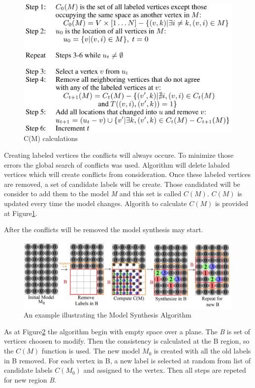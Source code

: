 \documentclass[b5paper,twoside,11pt]{article}
\renewcommand{\figurename}{Figure}
\begin{document}
\begin{figure}[h]
	\centering
	\includegraphics[width=0.85	\textwidth]{calcC}
		\caption{C(M) calculations}
	\label{CMCalc}
\end{figure}
Creating labeled vertices the conflicts will always occure. To minimize those errors the global search of conflicts was used. Algorithm will delete labaled vertices which will create conflicts from consideration. Once these labeled vertices are removed, a set of candidate labels will be create. Those candidated will be consider to add them to the model \textit{M} and this set is called $C(M)$. $C(M)$ is updated every time the model changes. Algorith to calculate $C(M)$ is provided at \figurename\ref{CMCalc}.

After the conflicts will be removed the model synthesis may start.

\begin{figure}[h]
	\centering
	\includegraphics[width=0.9	\textwidth]{modelSynthesis}
	\caption{An example illustrating the Model Synthesis Algorithm}
	\label{ModSynth}
\end{figure}
As at \figurename\ref{ModSynth} the algorithm begin with empty space over a plane. The \textit{B} is set of vertices choosen to modify. Then the consistency is calculated at the B region, so the $C(M)$ function is used. The new model $M_0$ is created with all the old labels in B removed. For each vertex in B, a new label is selected at random from  list of candidate labels $C(M_0 )$ and assigned to the vertex. Then all steps are repeted for new region \textit{B}.
\end{document}

